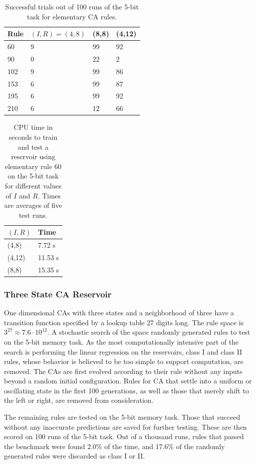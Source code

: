 \documentclass{elsarticle}
\begin{document}
\begin{multicols}{2}
\begin{table}[H] \centering
\begin{tabular}{|l|l|l|l|}
\hline
\textbf{Rule} & \boldmath$(I,R)=(4,8)$ & \textbf{(8,8)} & \textbf{(4,12)} \\ 
\hline
60 & 9 & 99 & 92 \\ \hline
90 & 0 & 22 & 2  \\ \hline
102 & 9 & 99 & 86 \\ \hline
153 & 6 & 99 & 87 \\ \hline
195 & 6 & 99 & 92 \\ \hline
210 & 6 & 12 & 66 \\ \hline
\end{tabular}
\caption{Successful trials out of 100 runs of the 5-bit task for elementary CA 
   rules.}
\label{table:elementary}
\end{table}

\begin{table}[H] \centering
\begin{tabular}{|l|l|}
\hline
\boldmath$(I,R)$ & \textbf{Time} \\ \hline
(4,8) & 7.72 s \\ \hline
(4,12) & 11.53 s \\ \hline
(8,8) & 15.35 s \\ \hline
\end{tabular}
\caption{CPU time in seconds to train and test a reservoir using elementary 
    rule 60 on the 5-bit task for different values of $I$ and $R$. Times are 
        averages of five test runs.}
\label{table:time}
\end{table}

  
\subsubsection{Three State CA Reservoir}
One dimensional CAs with three states and a neighborhood of three have a 
transition function specified by a lookup table 27 digits long. The rule space 
is $3^{27} \approx 7.6 \cdot 10^{12}$. A stochastic search of the space 
randomly generated rules to test on the 5-bit memory task. As the most 
computationally intensive part of the search is performing the linear 
regression on the reservoirs, class I and class II rules, whose behavior is 
believed to be too simple to support computation, are removed. The CAs are 
first evolved according to their rule without any inputs beyond a random 
initial configuration. Rules for CA that settle into a uniform or oscillating 
state in the first 100 generations, as well as those that merely shift to the 
left or right, are removed from consideration.\par
The remaining rules are tested on the 5-bit memory task.  Those that succeed 
without any inaccurate predictions are saved for further testing.  These are 
then scored on 100 runs of the 5-bit task.  Out of a thousand runs, rules that 
passed the benchmark were found 2.0\% of the time, and 17.6\% of the randomly 
generated rules were discarded as class I or II.
    

\end{multicols}
\end{document}
